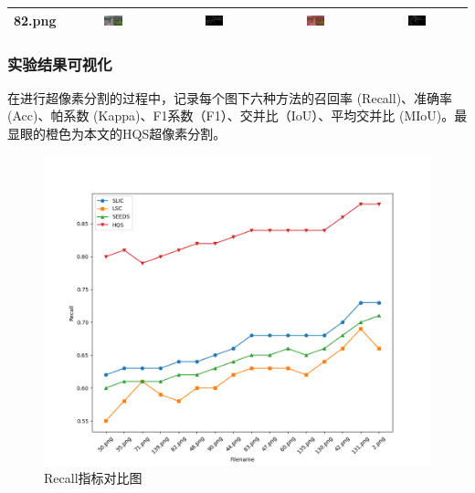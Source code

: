 \begin{table}[htbp]
\begin{tabular}{ccccc}
      82.png & \includegraphics[width=0.2\textwidth]{pic/raw/82.png} & \includegraphics[width=0.2\textwidth]{pic/rcf/82.png} & \includegraphics[width=0.2\textwidth]{pic/hqs/500/82.png} & \includegraphics[width=0.2\textwidth]{pic/gt/82.png} \\
      \bottomrule
    \end{tabular}
    \label{tab:result}
  \end{table}

  \newpage

\subsubsection{实验结果可视化}
在进行超像素分割的过程中，记录每个图下六种方法的召回率 (Recall)、准确率 (Acc)、帕系数 (Kappa)、F1系数（F1）、交并比（IoU）、平均交并比 (MIoU)。最显眼的橙色为本文的HQS超像素分割。

\begin{figure}[htbp]
	\centering
	\includegraphics[width=1\textwidth]{pic/Recall.png}
	\caption{Recall指标对比图}
    \label{fig:recall}
\end{figure}

